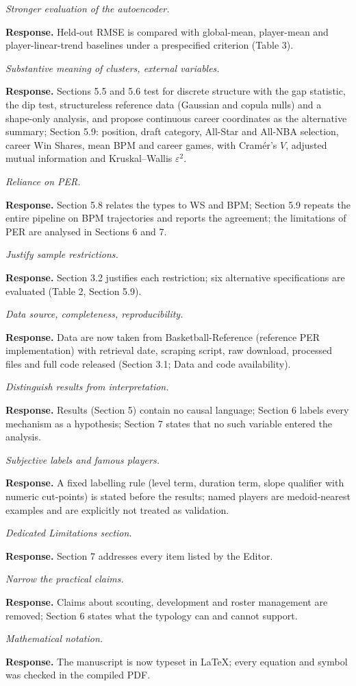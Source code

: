 \documentclass[11pt,a4paper]{article}
\newcommand{\point}[2]{\item[\textbf{#1}] \textit{#2}\par\vspace{2pt}}
\newcommand{\resp}{\par\noindent\textbf{Response.} }
\begin{document}
\begin{description}[leftmargin=1.2cm,style=nextline]
\point{13}{Stronger evaluation of the autoencoder.}
\resp Held-out RMSE is compared with global-mean, player-mean and player-linear-trend baselines under a prespecified criterion (Table 3).

\point{14}{Substantive meaning of clusters, external variables.}
\resp Sections 5.5 and 5.6 test for discrete structure with the gap statistic, the dip test, structureless reference data (Gaussian and copula nulls) and a shape-only analysis, and propose continuous career coordinates as the alternative summary; Section 5.9: position, draft category, All-Star and All-NBA selection, career Win Shares, mean BPM and career games, with Cram\'er's $V$, adjusted mutual information and Kruskal--Wallis $\varepsilon^2$.

\point{15}{Reliance on PER.}
\resp Section 5.8 relates the types to WS and BPM; Section 5.9 repeats the entire pipeline on BPM trajectories and reports the agreement; the limitations of PER are analysed in Sections 6 and 7.

\point{16}{Justify sample restrictions.}
\resp Section 3.2 justifies each restriction; six alternative specifications are evaluated (Table 2, Section 5.9).

\point{17}{Data source, completeness, reproducibility.}
\resp Data are now taken from Basketball-Reference (reference PER implementation) with retrieval date, scraping script, raw download, processed files and full code released (Section 3.1; Data and code availability).

\point{18}{Distinguish results from interpretation.}
\resp Results (Section 5) contain no causal language; Section 6 labels every mechanism as a hypothesis; Section 7 states that no such variable entered the analysis.

\point{19}{Subjective labels and famous players.}
\resp A fixed labelling rule (level term, duration term, slope qualifier with numeric cut-points) is stated before the results; named players are medoid-nearest examples and are explicitly not treated as validation.

\point{20}{Dedicated Limitations section.}
\resp Section 7 addresses every item listed by the Editor.

\point{21}{Narrow the practical claims.}
\resp Claims about scouting, development and roster management are removed; Section 6 states what the typology can and cannot support.

\point{22}{Mathematical notation.}
\resp The manuscript is now typeset in \LaTeX; every equation and symbol was checked in the compiled PDF.


\end{description}
\end{document}
